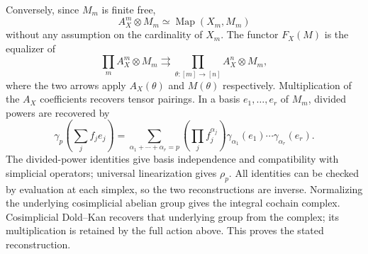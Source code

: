\documentclass[11pt,a4paper]{article}
\theoremstyle{definition}
\begin{document}
Conversely, since $M_m$ is finite free,
\[
 A_X^m\otimes M_m\simeq\operatorname{Map}(X_m,M_m)
\]
without any assumption on the cardinality of $X_m$. The functor $F_X(M)$ is the equalizer of
\[
 \prod_m A_X^m\otimes M_m
 \rightrightarrows\prod_{\theta:[m]\to[n]}A_X^n\otimes M_m,
\]
where the two arrows apply $A_X(\theta)$ and $M(\theta)$ respectively. Multiplication of the $A_X$ coefficients recovers tensor pairings. In a basis $e_1,\ldots,e_r$ of $M_m$, divided powers are recovered by
\[
 \gamma_p\left(\sum_jf_je_j\right)
 =\sum_{\alpha_1+\cdots+\alpha_r=p}
   \left(\prod_jf_j^{\alpha_j}\right)
   \gamma_{\alpha_1}(e_1)\cdots\gamma_{\alpha_r}(e_r).
\]
The divided-power identities give basis independence and compatibility with simplicial operators; universal linearization gives $\rho_p$. All identities can be checked by evaluation at each simplex, so the two reconstructions are inverse. Normalizing the underlying cosimplicial abelian group gives the integral cochain complex. Cosimplicial Dold--Kan recovers that underlying group from the complex; its multiplication is retained by the full action above. This proves the stated reconstruction.


\end{document}
